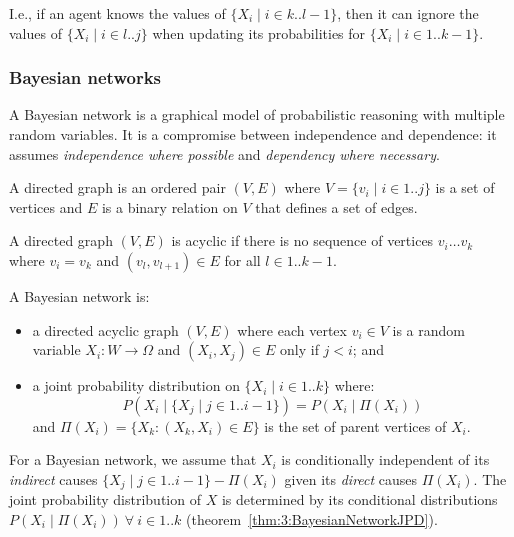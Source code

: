 I.e., if an agent knows the values of $\{ X_i \mid i \in k .. l - 1 \}$, then
it can ignore the values of $\{ X_i \mid i \in l .. j \}$ when updating its
probabilities for $\{ X_i \mid i \in 1 .. k - 1 \}$.

\subsubsection{Bayesian networks}

A Bayesian network is a graphical model of probabilistic reasoning with multiple
random variables.
It is a compromise between independence and dependence: it assumes
\textit{independence where possible} and \textit{dependency where necessary}.

\begin{dfn}
  A directed graph is an ordered pair $(V, E)$ where
  $V = \{ v_i \mid i \in 1 .. j \}$ is a set of vertices and $E$ is a binary
  relation on $V$ that defines a set of edges.
\end{dfn}

\begin{dfn}
  A directed graph $(V, E)$ is acyclic if there is no sequence of vertices
  $v_i \ldots v_k$ where $v_i = v_k$ and $(v_l, v_{l + 1}) \in E$ for all
  $l \in 1 .. k - 1$.
\end{dfn}

\begin{dfn}
  \label{def:3:BayesianNetwork}
  A Bayesian network is:
  \begin{itemize}
    \item a directed acyclic graph $(V, E)$ where each vertex $v_i \in V$ is a
          random variable $X_i : W \rightarrow \Omega$ and $(X_i, X_j) \in E$
          only if $j < i$; and
    \item a joint probability distribution on $\{ X_i \mid i \in 1 .. k \}$
          where:
          \begin{equation}
            P(X_i \mid \{ X_j \mid j \in 1 .. i - 1 \})
            = P(X_i \mid \Pi(X_i))
          \end{equation}
          and $\Pi(X_i) = \{ X_k : (X_k, X_i) \in E \}$ is the set of parent
          vertices of $X_i$.
  \end{itemize}
\end{dfn}

For a Bayesian network, we assume that $X_i$ is conditionally independent of its
\textit{indirect} causes $\{ X_j \mid j \in 1 .. i - 1 \} - \Pi(X_i)$ given its
\textit{direct} causes $\Pi(X_i)$.
The joint probability distribution of $X$ is determined by its conditional
distributions $P(X_i \mid \Pi(X_i)) \ \forall\ i \in 1 .. k$
(theorem~\ref{thm:3:BayesianNetworkJPD}).

